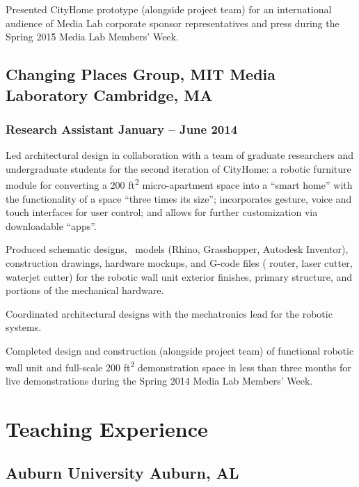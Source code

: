 \documentclass[letterpaper, oneside, 10pt]{article}
\begin{document}
Presented CityHome prototype (alongside project team) for an international
audience of Media Lab corporate sponsor representatives and press during
the Spring 2015  Media Lab Members’ Week.


\subsection*{Changing Places Group, MIT Media Laboratory\DotSep{0.25em} Cambridge, MA}
\subsubsection*{Research Assistant\DotSep{0.25em} January -- June 2014}

Led architectural design in collaboration with a team of graduate
researchers and undergraduate students for the second iteration of
CityHome: a robotic furniture module for converting a 200
ft\textsuperscript{2} micro-apartment space into a ``smart home'' with the
functionality of a space ``three times its size''; incorporates gesture,
voice and touch interfaces for user control; and allows for further
customization via downloadable ``apps''.

Produced schematic designs, \ models (Rhino, Grasshopper, Autodesk
Inventor), construction drawings, hardware mockups, and G-code files
( router, laser cutter, waterjet cutter) for the robotic
wall unit exterior finishes, primary structure, and portions of the
mechanical hardware.

Coordinated architectural designs with the mechatronics lead for the
robotic systems.

Completed design and construction (alongside project team) of functional
robotic wall unit and full-scale 200 ft\textsuperscript{2} demonstration
space in less than three months for live demonstrations during the Spring
2014  Media Lab Members’ Week.



\section*{Teaching Experience} %

\hfill
\vspace{-25pt}


\subsection*{Auburn University\DotSep{0.25em} Auburn, AL}
\end{document}
